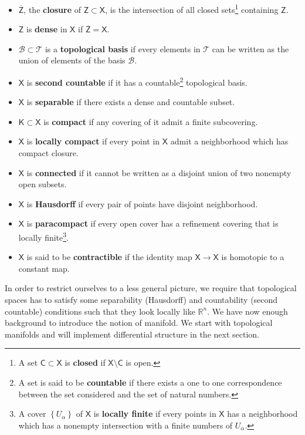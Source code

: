 \documentclass[12pt]{book}
\newcommand{\Bcal}{\mathcal{B}}
\newcommand{\Tcal}{\mathcal{T}}
\newcommand{\Rbb}{\mathbb{R}}
\newcommand{\Csf}{\mathsf{C}}
\newcommand{\Ksf}{\mathsf{K}}
\newcommand{\Xsf}{\mathsf{X}}
\newcommand{\Zsf}{\mathsf{Z}}
\theoremstyle{break}
\begin{document}
\begin{itemize}
%
\item $\overline{\Zsf}$, the \textbf{closure} of $\Zsf \subset \Xsf$, is the intersection of all closed sets\footnote{A set $\Csf \subset \Xsf$ is \textbf{closed} if $\Xsf \setminus \Csf$ is open.} containing $\Zsf$.%
%
\item $\Zsf$ is \textbf{dense} in $\Xsf$ if $\overline{\Zsf} = \Xsf$.%
%
\item $\Bcal \subset \Tcal$ is a \textbf{topological basis} if every elements in $\Tcal$ can be written as the union of elements of the basis $\Bcal$.%
%
\item $\Xsf$ is \textbf{second countable} if it has a countable\footnote{A set is said to be \textbf{countable} if there exists a one to one correspondence between the set considered and the set of natural numbers.} topological basis.%
%
\item $\Xsf$ is \textbf{separable} if there exists a dense and countable subset.%
%
\item $\Ksf \subset \Xsf$ is \textbf{compact} if any covering of it admit a finite subcovering.%
%
\item $\Xsf$ is \textbf{locally compact} if every point in $\Xsf$ admit a neighborhood which has compact closure.%
%
\item $\Xsf$ is \textbf{connected} if it cannot be written as a disjoint union of two nonempty open subsets.%
%
\item $\Xsf$ is \textbf{Hausdorff} if every pair of points have disjoint neighborhood.%
%
\item $\Xsf$ is \textbf{paracompact} if every open cover has a refinement covering that is locally finite\footnote{A cover $\left\{U_\alpha\right\}$ of $\Xsf$ is \textbf{locally finite} if every points in $\Xsf$ has a neighborhood which has a nonempty intersection with a finite numbers of $U_\alpha$.}.%
%
\item $\Xsf$ is said to be \textbf{contractible} if the identity map $\Xsf \to \Xsf$ is homotopic to a constant map.
\end{itemize}


In order to restrict ourselves to a less general picture, we require that topological spaces has to satisfy some separability (Hausdorff) and countability (second countable) conditions such that they look locally like $\Rbb^n$. We have now enough background to introduce the notion of manifold. We start with topological manifolds and will implement differential structure in the next section.%
\end{document}
